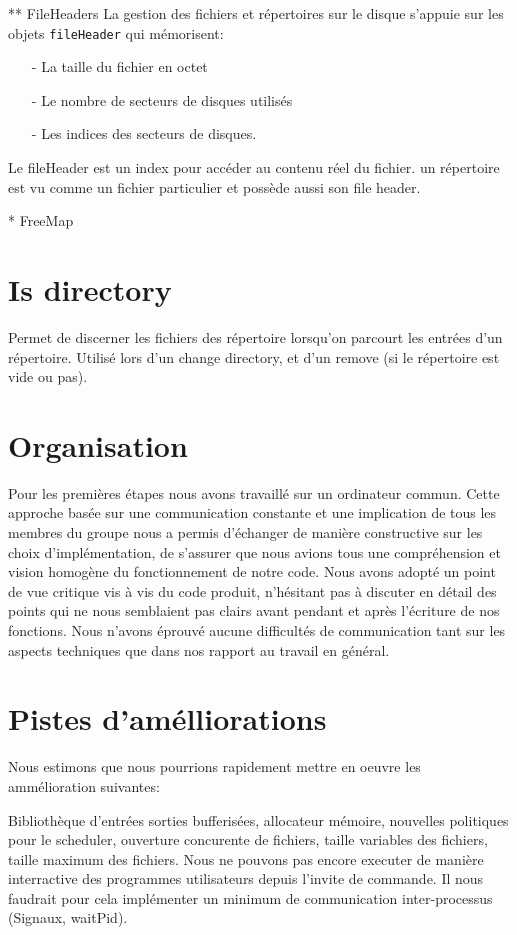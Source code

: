 \documentclass[11pt]{article}
\theoremstyle{definition}
\theoremstyle{definition}
\begin{document}
** FileHeaders
La gestion des fichiers et répertoires sur le disque s'appuie sur les objets \texttt{fileHeader} qui mémorisent:
\begin{itemize}
\item[-] La taille du fichier en octet
\item[-] Le nombre de secteurs de disques utilisés
\item[-] Les indices des secteurs de disques.
\end{itemize}
Le fileHeader est un index pour accéder au contenu réel du fichier.
un répertoire est vu comme un fichier particulier et possède aussi son file header.
 
* FreeMap

\section{Is directory}
Permet de discerner les fichiers des répertoire lorsqu'on parcourt les entrées d'un répertoire.
Utilisé lors d'un change directory, et d'un remove (si le répertoire est vide ou pas).

\section{Organisation}
Pour les premières étapes nous avons travaillé sur un ordinateur commun.
Cette approche basée sur une communication constante et une implication de tous les membres du groupe
nous a permis d'échanger de manière constructive sur les choix d'implémentation, de s'assurer que
nous avions tous une compréhension et vision homogène du fonctionnement de notre code. Nous
avons adopté un point de vue critique vis à vis du code produit,
n'hésitant pas à discuter en détail des points qui ne nous semblaient pas clairs
avant pendant et après l'écriture de nos fonctions. Nous n'avons éprouvé aucune difficultés de communication
tant sur les aspects techniques que dans nos rapport au travail en général.

\section{Pistes d'amélliorations}
Nous estimons que nous pourrions rapidement mettre en oeuvre les ammélioration suivantes:

Bibliothèque d'entrées sorties bufferisées, allocateur mémoire, nouvelles politiques pour le scheduler,
ouverture concurente de fichiers, taille variables des fichiers, taille maximum des fichiers.
Nous ne pouvons pas encore executer de manière interractive des programmes utilisateurs depuis l'invite de commande. Il nous faudrait pour cela implémenter un minimum de communication inter-processus (Signaux, waitPid).
\end{document}
